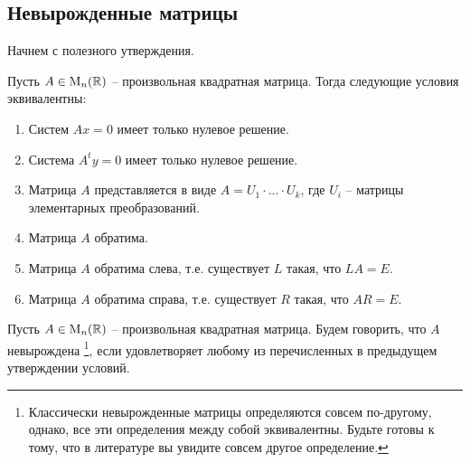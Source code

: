\subsection{Невырожденные матрицы}

Начнем с полезного утверждения.

\begin{claim}
\label{claim::InvertibleDiscription}
Пусть $A\in\operatorname{M}_{n}(\mathbb R)$ -- произвольная квадратная матрица.
Тогда следующие условия эквивалентны:
\begin{enumerate}
\item Систем $Ax = 0$ имеет только нулевое решение.

\item Система $A^ty = 0$ имеет только нулевое решение.

\item Матрица $A$ представляется в виде $A = U_1\cdot \ldots \cdot U_k$, где $U_i$ -- матрицы элементарных преобразований.

\item Матрица $A$ обратима.

\item Матрица $A$ обратима слева, т.е. существует $L$ такая, что $LA = E$.

\item Матрица $A$ обратима справа, т.е. существует $R$ такая, что $AR = E$.
\end{enumerate}
\end{claim}

\begin{definition}
Пусть $A\in\operatorname{M}_{n}(\mathbb R)$ -- произвольная квадратная матрица. Будем говорить, что $A$ невырождена%
\footnote{Классически невырожденные матрицы определяются совсем по-другому, однако, все эти определения между собой эквивалентны.
Будьте готовы к тому, что в литературе вы увидите совсем другое определение.},
если удовлетворяет любому из перечисленных в предыдущем утверждении условий.
\end{definition}
